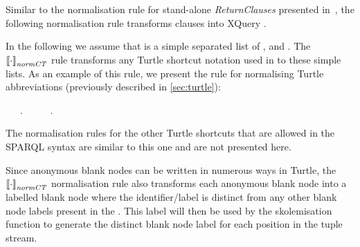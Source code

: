 Similar to the normalisation rule for stand-alone \textit{ReturnClauses} presented in~\citet[Section
4.8.1]{DraperFankhauserFernandez:2010aa}, the following normalisation rule transforms \CONSTRUCT clauses into XQuery
.
%
\begin{normalisationrule}%
  \label{eq:construct2forclause2}
\end{normalisationrule}%
%
In the following we assume that \ConstructTemplate is a simple  separated list of ,
 and . The~$\left\llbracket{\cdot}\right\rrbracket_{\mathit{normCT}}$ rule transforms any Turtle shortcut notation
used in \ConstructTemplate to these simple lists.
%
As an example of this rule, we present the rule for normalising Turtle~\character{;} abbreviations (previously described
in \cref{sec:turtle}):
%
\begin{normalisationrule}%
   {%
    ~~~.~\dotsb~
    ~~~.%
  }
  \label{eq:flatten-triples}
\end{normalisationrule}%
%
The normalisation rules for the other Turtle shortcuts that are allowed in the SPARQL \ConstructTemplate syntax are
similar to this one and are not presented here. 

Since anonymous blank nodes can be written in numerous ways in Turtle, the~$\left\llbracket{\cdot}\right\rrbracket_{\mathit{normCT}}$ normalisation rule also
transforms each anonymous blank node into a labelled blank node where the identifier/label is distinct from any other
blank node labels present in the \ConstructTemplate.  This label will then be used by the skolemisation function to
generate the distinct blank node label for each position in the tuple stream.


